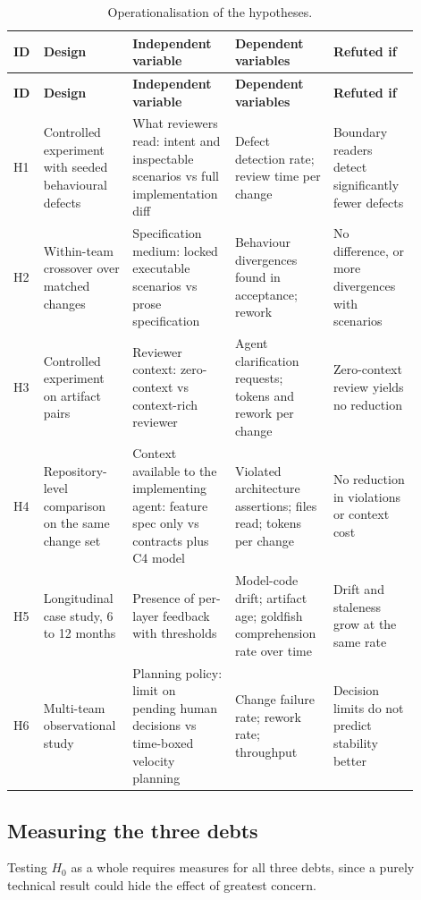 \documentclass[11pt]{article}
\begin{document}
\small
\begin{longtable}{p{0.05\linewidth}p{0.2\linewidth}p{0.22\linewidth}p{0.23\linewidth}p{0.2\linewidth}}
\caption{Operationalisation of the hypotheses.}\\
\toprule
\textbf{ID} & \textbf{Design} & \textbf{Independent variable} & \textbf{Dependent variables} & \textbf{Refuted if} \\
\midrule
\endfirsthead
\toprule
\textbf{ID} & \textbf{Design} & \textbf{Independent variable} & \textbf{Dependent variables} & \textbf{Refuted if} \\
\midrule
\endhead
H1 & Controlled experiment with seeded behavioural defects & What reviewers read: intent and inspectable scenarios vs full implementation diff & Defect detection rate; review time per change & Boundary readers detect significantly fewer defects \\
H2 & Within-team crossover over matched changes & Specification medium: locked executable scenarios vs prose specification & Behaviour divergences found in acceptance; rework & No difference, or more divergences with scenarios \\
H3 & Controlled experiment on artifact pairs & Reviewer context: zero-context vs context-rich reviewer & Agent clarification requests; tokens and rework per change & Zero-context review yields no reduction \\
H4 & Repository-level comparison on the same change set & Context available to the implementing agent: feature spec only vs contracts plus C4 model & Violated architecture assertions; files read; tokens per change & No reduction in violations or context cost \\
H5 & Longitudinal case study, 6 to 12 months & Presence of per-layer feedback with thresholds & Model-code drift; artifact age; goldfish comprehension rate over time & Drift and staleness grow at the same rate \\
H6 & Multi-team observational study & Planning policy: limit on pending human decisions vs time-boxed velocity planning & Change failure rate; rework rate; throughput & Decision limits do not predict stability better \\
\bottomrule
\end{longtable}
\normalsize

\subsection{Measuring the three debts}

Testing $H_0$ as a whole requires measures for all three debts, since a purely technical result could hide the effect of greatest concern.
\end{document}
